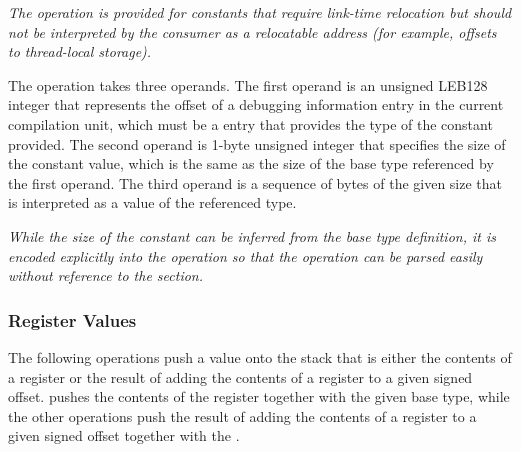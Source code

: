 \begin{enumerate}[1. ]
\textit{The \DWOPconstxNAME{} operation is provided for constants that
require link-time relocation but should not be
interpreted by the consumer as a relocatable address
(for example, offsets to thread-local storage).}

\itembfnl{\DWOPconsttypeTARG}
The \DWOPconsttypeNAME{} operation takes three operands. The first operand 
is an unsigned LEB128 integer that represents the offset of a debugging
information entry in the current compilation unit, which must be a
\DWTAGbasetype{} entry that provides the type of the constant provided. The
second operand is 1-byte unsigned integer that specifies the size of the
constant value, which is the same as the size of the base type referenced
by the first operand. The third operand is a 
sequence of bytes of the given size that is 
interpreted as a value of the referenced type.

\textit{While the size of the constant can be inferred from the base type
definition, it is encoded explicitly into the operation so that the
operation can be parsed easily without reference to the \dotdebuginfo{}
section.}

\end{enumerate}

\subsubsection{Register Values}
\label{chap:registervalues}
The following operations push a value onto the stack that is either the
contents of a register or the result of adding the contents of a register
to a given signed offset. 
\DWOPregvaltype{} pushes the contents
of the register together with the given base type, while the other operations
push the result of adding the contents of a register to a given
signed offset together with the \generictype.

